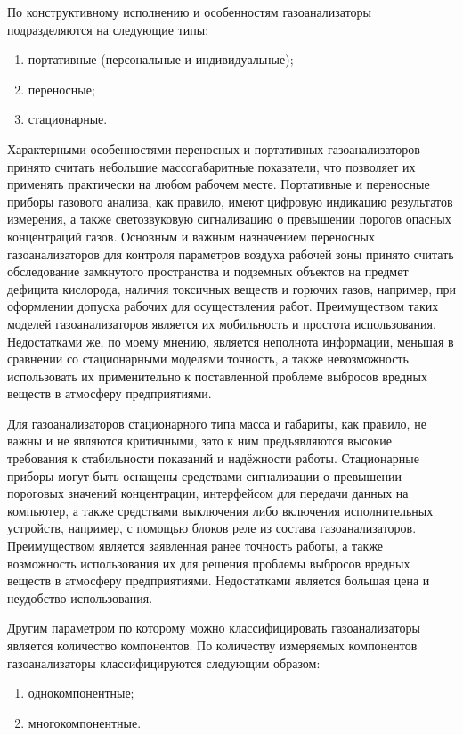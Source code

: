 \documentclass[14pt, a4paper]{extreport}
\begin{document}
	По конструктивному исполнению и особенностям газоанализаторы подразделяются на следующие типы:
	\begin{enumerate}[label={\arabic*)}]
		\item портативные (персональные и индивидуальные);
		\item переносные;
		\item стационарные.
	\end{enumerate}	
	
	Характерными особенностями переносных и портативных газоанализаторов принято считать небольшие массогабаритные показатели, что позволяет их применять практически на любом рабочем месте. Портативные и переносные приборы газового анализа, как правило, имеют цифровую индикацию результатов измерения, а также светозвуковую сигнализацию о превышении порогов опасных концентраций газов. Основным и важным назначением переносных газоанализаторов для контроля параметров воздуха рабочей зоны принято считать обследование замкнутого пространства и подземных объектов на предмет дефицита кислорода, наличия токсичных веществ и горючих газов, например, при оформлении допуска рабочих для осуществления работ. Преимуществом таких моделей газоанализаторов является их мобильность и простота использования. Недостатками же, по моему мнению, является неполнота информации, меньшая в сравнении со стационарными моделями точность, а также невозможность использовать их применительно к поставленной проблеме выбросов вредных веществ в атмосферу предприятиями.
	
	Для газоанализаторов стационарного типа масса и габариты, как правило, не важны и не являются критичными, зато к ним предъявляются высокие требования к стабильности показаний и надёжности работы. Стационарные приборы могут быть оснащены средствами сигнализации о превышении пороговых значений концентрации, интерфейсом для передачи данных на компьютер, а также средствами выключения либо включения исполнительных устройств, например, с помощью блоков реле из состава газоанализаторов. Преимуществом является заявленная ранее точность работы, а также возможность использования их для решения проблемы выбросов вредных веществ в атмосферу предприятиями. Недостатками является большая цена и неудобство использования.
	
	Другим параметром по которому можно классифицировать газоанализаторы является количество компонентов. По количеству измеряемых компонентов газоанализаторы классифицируются следующим образом:
	\begin{enumerate}[label={\arabic*)}]
		\item однокомпонентные;
		\item многокомпонентные.
	\end{enumerate}
	
\end{document}
